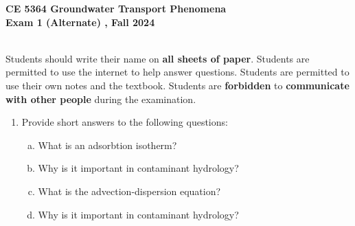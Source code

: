 \documentclass[12pt]{article}
\begin{document}
\begingroup
\begin{centering}
\textbf{CE 5364 Groundwater Transport Phenomena } \\
\textbf{Exam 1 (Alternate) , Fall 2024}\\
\end{centering}
~\\
Students should write their name on \textbf{all sheets of paper}.  \newline 
Students are permitted to use the internet to help answer questions.  \newline 
Students are permitted to use their own notes and the textbook.\newline 
Students are \textbf{forbidden} to \textbf{communicate with other people} during the examination.
\endgroup

\begin{enumerate}
\item Provide short answers to the following questions:
\begin{enumerate}[a)]
\item What is an adsorbtion isotherm?
~\newline
~\newline
~\newline
~\newline
~\newline
\item Why is it important in contaminant hydrology?
~\newline 
~\newline
~\newline
~\newline
~\newline
~\newline
\item  What is the advection-dispersion equation?
~\newline
~\newline
~\newline
~\newline
~\newline
~\newline
\item Why is it important in contaminant hydrology?
~\newline
~\newline
~\newline
~\newline
~\newline
~\newline
\end{enumerate}

\end{enumerate}
\end{document}
